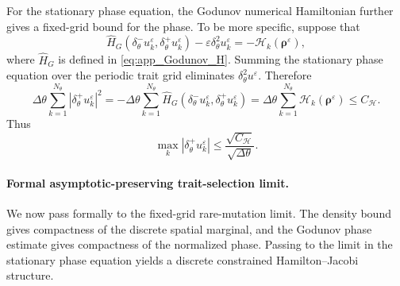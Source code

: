 \documentclass[11pt]{article}
\numberwithin{equation}{section}
\begin{document}
For the stationary phase equation, the Godunov numerical Hamiltonian further gives a
fixed-grid bound for the phase.  To be more specific, suppose that
\begin{equation}\label{def:Godunov_eq}
    \widehat H_G
    \left(
        \delta_\theta^-u_k^\varepsilon,
        \delta_\theta^+u_k^\varepsilon
    \right)
    -
    \varepsilon\delta_\theta^2u_k^\varepsilon
    =
    -\mathcal H_k(\boldsymbol\rho^\varepsilon),
\end{equation}
where $\widehat H_G$ is defined in \eqref{eq:app_Godunov_H}.  
Summing the stationary phase equation over the periodic trait grid eliminates
\(\delta_\theta^2u^\varepsilon\).  Therefore
\[
    \Delta\theta
    \sum_{k=1}^{N_\theta} |\delta_\theta^+u_k^\varepsilon|^2
    =
    -\Delta\theta
    \sum_{k=1}^{N_\theta}
    \widehat H_G
    \left(
        \delta_\theta^-u_k^\varepsilon,
        \delta_\theta^+u_k^\varepsilon
    \right)
    =
    \Delta\theta
    \sum_{k=1}^{N_\theta}
    \mathcal H_k(\boldsymbol\rho^\varepsilon)
    \le C_{\mathcal H}.
\]
Thus
\begin{equation}\label{proof:bound_Du}
    \max_k |\delta_\theta^+u_k^\varepsilon|
    \le
    \frac{\sqrt{C_{\mathcal H}}}{\sqrt{\Delta\theta}} .
\end{equation}


\paragraph{Formal asymptotic-preserving trait-selection limit.}

We now pass formally to the fixed-grid rare-mutation limit.  The density bound
gives compactness of the discrete spatial marginal, and the Godunov phase
estimate gives compactness of the normalized phase.  Passing to the limit in
the stationary phase equation yields a discrete constrained Hamilton--Jacobi
structure.
\end{document}
